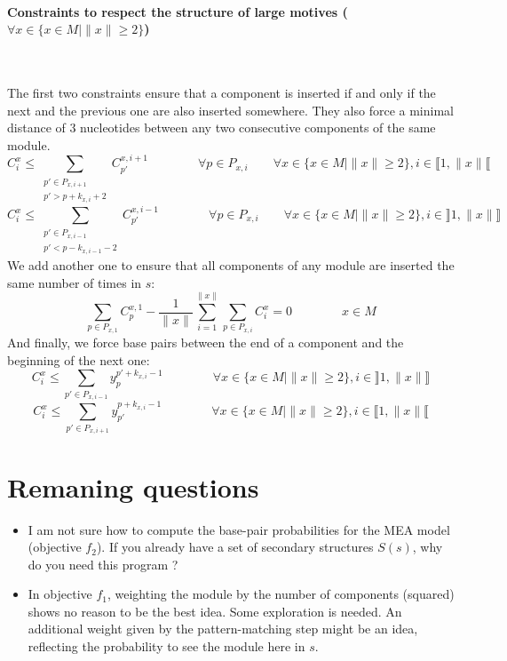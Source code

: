 \documentclass{article}
\begin{document}
\paragraph{Constraints to respect the structure of large motives ($\forall x \in \{ x\in M | \|x\| \geq 2\}$)} ~ 

The first two constraints ensure that a component is inserted if and only if the next and the previous one are also inserted somewhere.
They also force a minimal distance of 3 nucleotides between any two consecutive components of the same module.
\begin{equation}\label{constraint:6}
	C^x_i \leq \sum_{\substack{p' \in P_{x,i+1}\\ p'>p+k_{x,i}+2}} C^{x,i+1}_{p'}	
	\qquad \qquad \forall p \in P_{x,i} \qquad \forall x \in \{ x\in M | \|x\| \geq 2\}, i \in \llbracket 1,\|x\| \llbracket
\end{equation}
\begin{equation}\label{constraint:7}
	C^x_i \leq \sum_{\substack{p' \in P_{x,i-1}\\ p'<p-k_{x,i-1}-2}} C^{x,i-1}_{p'}	
	\qquad \qquad \forall p \in P_{x,i} \qquad \forall x \in \{ x\in M | \|x\| \geq 2\}, i \in \rrbracket 1,\|x\| \rrbracket
\end{equation}
We add another one to ensure that all components of any module are inserted the same number of times in $s$:
\begin{equation}\label{constraint:8}
	\sum_{p\in P_{x,1}} C^{x,1}_p - \frac{1}{\|x\|} \sum_{i=1}^{\|x\|} \sum_{p\in P_{x,i}} C^x_i = 0  \qquad \qquad x\in M
\end{equation}
And finally, we force base pairs between the end of a component and the beginning of the next one:
\begin{equation}\label{constraint:9}
	C^x_i \leq \sum_{p' \in P_{x,i-1}} y^{p'+k_{x,i}-1}_p \qquad \qquad \forall x \in \{ x\in M | \|x\| \geq 2\}, i \in \rrbracket 1,\|x\| \rrbracket
\end{equation}
\begin{equation}\label{constraint:10}
	C^x_i \leq \sum_{p' \in P_{x,i+1}} y^{p+k_{x,i}-1}_{p'} \qquad \qquad \forall x \in \{ x\in M | \|x\| \geq 2\}, i \in \llbracket 1,\|x\| \llbracket
\end{equation}

\section{Remaning questions}
	\begin{itemize}
		\item I am not sure how to compute the base-pair probabilities for the MEA model (objective $f_2$). 
		If you already have a set of secondary structures $S(s)$, why do you need this program ?
		\item In objective $f_1$, weighting the module by the number of components (squared) shows no reason to be the best idea. 
		Some exploration is needed. An additional weight given by the pattern-matching step might be an idea, reflecting the probability to see the module here in $s$.
		
	\end{itemize}
	


\end{document}
